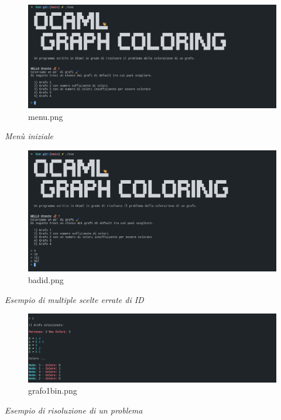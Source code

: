 \documentclass[11pt]{article}
\begin{document}
    \begin{figure}
\centering
\includegraphics{Colored Camel_files/menu.png}
\caption{menu.png}
\end{figure}

\emph{Menù iniziale}

    \begin{figure}
\centering
\includegraphics{Colored Camel_files/badid.png}
\caption{badid.png}
\end{figure}

\emph{Esempio di multiple scelte errate di ID}

    \begin{figure}
\centering
\includegraphics{Colored Camel_files/grafo1bin.png}
\caption{grafo1bin.png}
\end{figure}

\emph{Esempio di risoluzione di un problema}
\end{document}
